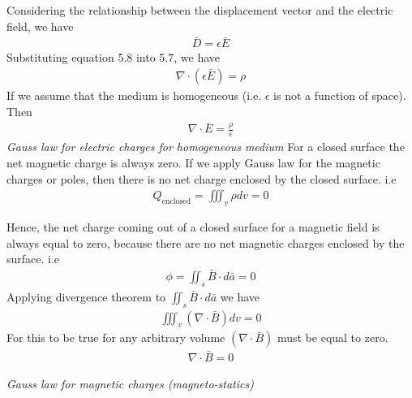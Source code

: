 Considering the relationship between the displacement vector and the electric field, we have 
\begin{align}
\boxed{\bar{D} = \epsilon\bar{E}}
\end{align}
Substituting equation 5.8 into 5.7, we have
\begin{align*}
\nabla \cdot (\epsilon\bar{E}) = \rho
\end{align*}
If we assume that the medium is homogeneous (i.e. $\epsilon$ is not a function of space). Then
\begin{align} 
\boxed{\nabla \cdot \bar{E} = \frac{\rho}{\epsilon}}
\end{align} 
\emph{Gauss law for electric charges for homogeneous medium}
For a closed surface the net magnetic charge is always zero. If we apply Gauss law for the magnetic charges or poles, then there is no net charge enclosed by the closed surface. i.e
\begin{align*}
Q_{\text{enclosed}} = \iiint_v\rho dv = 0
\end{align*}

Hence, the net charge coming out of a closed surface for a magnetic field is always equal to zero, because there are no net magnetic charges enclosed by the surface. i.e 
\begin{align*}
\phi = \iint_s\bar{B}\cdot d\bar{a} = 0
\end{align*}
Applying divergence theorem to $\iint_s\bar{B}\cdot d\bar{a}$ we have
 \begin{align*}
\iiint_v(\nabla \cdot \bar{B})dv = 0
\end{align*}	
For this to be true for any arbitrary volume $(\nabla \cdot \bar{B})$ must be equal to zero.
\begin{align}
\boxed{\nabla \cdot \bar{B} = 0}
\end{align}
\begin{center}
\emph{Gauss law for magnetic charges (magneto-statics)}
\end{center}

